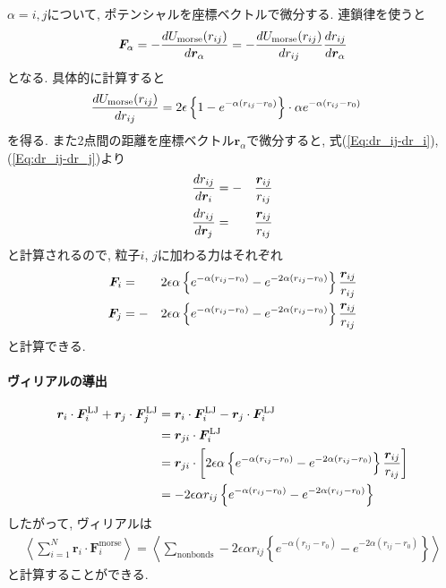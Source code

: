$\alpha = i, j$について, ポテンシャルを座標ベクトルで微分する. 連鎖律を使うと
\begin{equation}
   \bm{F}_{\alpha}
   =
   -
   \frac{d U_{\mathrm{morse}}(r_{ij})}{d \bm{r}_{\alpha}}
   =
   -
   \frac{d U_{\mathrm{morse}}(r_{ij})}{d r_{ij}}
   \frac{d r_{ij}}{d \bm{r}_{\alpha}}
   \notag
\end{equation}
となる. 具体的に計算すると
\begin{align}
   \frac{d U_{\mathrm{morse}}(r_{ij})}{d r_{ij}}
   &=
   2\epsilon
   \left\{
      1 - e^{-\alpha(r_{ij} - r_{0})}
   \right\}
   \cdot
   \alpha
   e^{-\alpha(r_{ij} - r_{0})}
   \notag
\end{align}
を得る. また2点間の距離を座標ベクトル$\bm{r}_{\alpha}$で微分すると, 式(\ref{Eq:dr_ij-dr_i}), (\ref{Eq:dr_ij-dr_j})より
\begin{alignat}{3}
   \frac{d r_{ij}}{d \bm{r}_{i}}
   &=
   -&&
   \frac{\bm{r}_{ij}}{r_{ij}}
   \notag
   \\
   \frac{d r_{ij}}{d \bm{r}_{j}}
   &=&&
   \frac{\bm{r}_{ij}}{r_{ij}}
   \notag
\end{alignat}
と計算されるので, 粒子$i$, $j$に加わる力はそれぞれ
\begin{alignat}{3}
   \bm{F}_{i}
   &=&&
   2\epsilon \alpha
   \left\{
      e^{-\alpha(r_{ij} - r_{0})}
      -
      e^{-2\alpha(r_{ij} - r_{0})}
   \right\}
   \frac{\bm{r}_{ij}}{r_{ij}}
   \notag \\
   \bm{F}_{j}
   &=
   -&&
   2\epsilon \alpha
   \left\{
      e^{-\alpha(r_{ij} - r_{0})}
      -
      e^{-2\alpha(r_{ij} - r_{0})}
   \right\}
   \frac{\bm{r}_{ij}}{r_{ij}}
   \notag
\end{alignat}
と計算できる.

\paragraph{ヴィリアルの導出}

\begin{align}
    \bm{r}_{i} \cdot \bm{F}_{i}^{\mathrm{LJ}}
   +\bm{r}_{j} \cdot \bm{F}_{j}^{\mathrm{LJ}}
 &=
    \bm{r}_{i} \cdot \bm{F}_{i}^{\mathrm{LJ}}
   -\bm{r}_{j} \cdot \bm{F}_{i}^{\mathrm{LJ}}
 \notag
 \\
 &=
    \bm{r}_{ji} \cdot \bm{F}_{i}^{\mathrm{LJ}}
 \notag
 \\
 &=
    \bm{r}_{ji} \cdot
    \left[
      2\epsilon \alpha
      \left\{
         e^{-\alpha(r_{ij} - r_{0})}
         -
         e^{-2\alpha(r_{ij} - r_{0})}
      \right\}
      \frac{\bm{r}_{ij}}{r_{ij}}
    \right]
 \notag
 \\
 &=
 -2\epsilon \alpha r_{ij}
 \left\{
    e^{-\alpha(r_{ij} - r_{0})}
    -
    e^{-2\alpha(r_{ij} - r_{0})}
 \right\}
 \notag
\end{align}
したがって, ヴィリアルは
\begin{align}
   \left\langle
        \sum_{i=1}^{N} \bm{r}_{i} \cdot \bm{F}_{i}^{\mathrm{morse}}
   \right\rangle
 =
   \left\langle
        \sum_{\mathrm{nonbonds}}
        -2\epsilon \alpha r_{ij}
        \left\{
           e^{-\alpha(r_{ij} - r_{0})}
           -
           e^{-2\alpha(r_{ij} - r_{0})}
        \right\}
   \right\rangle
\end{align}
と計算することができる.
\clearpage

